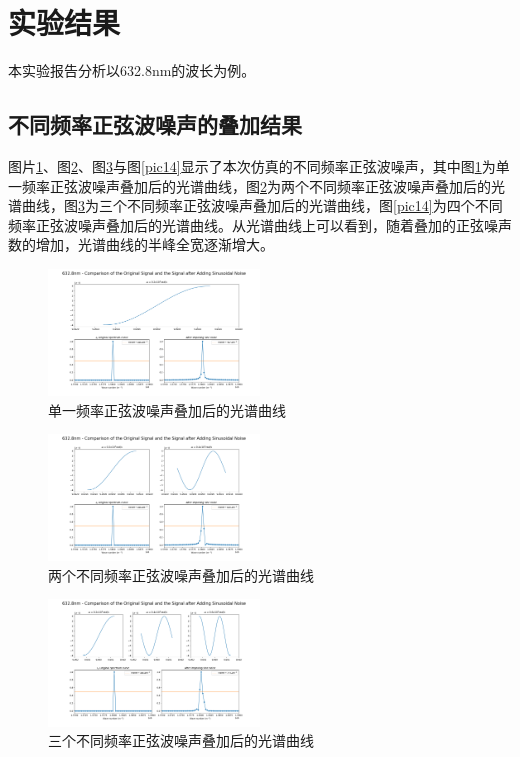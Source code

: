 \documentclass[conference]{IEEEtran}
\begin{document}
\section{实验结果}
本实验报告分析以632.8nm的波长为例。

\subsection{不同频率正弦波噪声的叠加结果}
图片\ref{pic1}、图\ref{pic2}、图\ref{pic3}与图\ref{pic14}显示了本次仿真的不同频率正弦波噪声，其中图\ref{pic1}为单一频率正弦波噪声叠加后的光谱曲线，图\ref{pic2}为两个不同频率正弦波噪声叠加后的光谱曲线，图\ref{pic3}为三个不同频率正弦波噪声叠加后的光谱曲线，图\ref{pic14}为四个不同频率正弦波噪声叠加后的光谱曲线。从光谱曲线上可以看到，随着叠加的正弦噪声数的增加，光谱曲线的半峰全宽逐渐增大。

\begin{figure}[htbp]
    \centerline{\includegraphics[width=0.5\textwidth]{1种波叠加.png}}
    \caption{单一频率正弦波噪声叠加后的光谱曲线}
    \label{pic1}
\end{figure}

\begin{figure}[htbp]
    \centerline{\includegraphics[width=0.5\textwidth]{2种波叠加.png}}
    \caption{两个不同频率正弦波噪声叠加后的光谱曲线}
    \label{pic2}
\end{figure}

\begin{figure}[htbp]
    \centerline{\includegraphics[width=0.5\textwidth]{3种波叠加.png}}
    \caption{三个不同频率正弦波噪声叠加后的光谱曲线}
    \label{pic3}
\end{figure}
\end{document}
